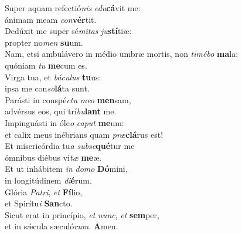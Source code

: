 \evenverse Super aquam refectió\textit{nis} \textit{e}\textit{du}\textbf{cá}vit me:~\*\\
\evenverse ánimam meam \textit{con}\textbf{vér}tit.\\
\oddverse Dedúxit me super sé\textit{mi}\textit{tas} \textit{ju}\textbf{stí}tiæ:~\*\\
\oddverse propter no\textit{men} \textbf{su}um.\\
\evenverse Nam, etsi ambulávero in médio umbræ mortis, non \textit{ti}\textit{mé}\textit{bo} \textbf{ma}la:~\*\\
\evenverse quóniam \textit{tu} \textbf{me}cum es.\\
\oddverse Virga tua, et \textit{bá}\textit{cu}\textit{lus} \textbf{tu}us:~\*\\
\oddverse ipsa me con\textit{so}\textbf{lá}ta sunt.\\
\evenverse Parásti in conspé\textit{ctu} \textit{me}\textit{o} \textbf{men}sam,~\*\\
\evenverse advérsus eos, qui trí\textit{bu}\textbf{lant} me.\\
\oddverse Impinguásti in óle\textit{o} \textit{ca}\textit{put} \textbf{me}um:~\*\\
\oddverse et calix meus inébrians quam \textit{præ}\textbf{clá}rus est!\\
\evenverse Et misericórdia tu\textit{a} \textit{sub}\textit{se}\textbf{qué}tur me~\*\\
\evenverse ómnibus diébus vi\textit{tæ} \textbf{me}æ.\\
\oddverse Et ut inhábitem \textit{in} \textit{do}\textit{mo} \textbf{Dó}mini,~\*\\
\oddverse in longitúdinem \textit{di}\textbf{é}rum.\\
\evenverse Glória \textit{Pa}\textit{tri}, \textit{et} \textbf{Fí}lio,~\*\\
\evenverse et Spirítu\textit{i} \textbf{San}cto.\\
\oddverse Sicut erat in princípio, \textit{et} \textit{nunc}, \textit{et} \textbf{sem}per,~\*\\
\oddverse et in sǽcula sæculó\textit{rum}. \textbf{A}men.\\
